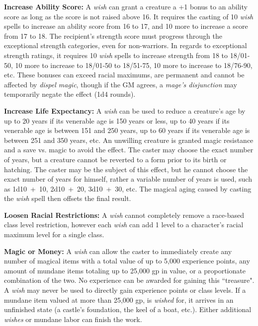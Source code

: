 \begin{multicols}{2}
\textbf{Increase Ability Score:} A \textit{wish} can grant a creature a +1 bonus to an ability score as long as the score is not raised above 16.  It requires the casting of 10 \textit{wish} spells to increase an ability score from 16 to 17, and 10 more to increase a score from 17 to 18.  The recipient's strength score must progress through the exceptional strength categories, even for non-warriors.  In regards to exceptional strength ratings, it requires 10 \textit{wish} spells to increase strength from 18 to 18/01-50, 10 more to increase to 18/01-50 to 18/51-75, 10 more to increase to 18/76-90, etc.  These bonuses can exceed racial maximums, are permanent and cannot be affected by \textit{dispel magic}, though if the GM agrees, a \textit{mage's disjunction} may temporarily negate the effect (1d4 rounds).

\textbf{Increase Life Expectancy:} A \textit{wish} can be used to reduce a creature's age by up to 20 years if its venerable age is 150 years or less, up to 40 years if its venerable age is between 151 and 250 years, up to 60 years if its venerable age is between 251 and 350 years, etc.  An unwilling creature is granted magic resistance and a save vs. magic to avoid the effect.  The caster may choose the exact number of years, but a creature cannot be reverted to a form prior to its birth or hatching.  The caster may be the subject of this effect, but he cannot choose the exact number of years for himself, rather a variable number of years is used, such as 1d10~+~10, 2d10~+~20, 3d10~+~30, etc.  The magical aging caused by casting the \textit{wish} spell then offsets the final result.

\textbf{Loosen Racial Restrictions:} A \textit{wish} cannot completely remove a race-based class level restriction, however each \textit{wish} can add 1 level to a character's racial maximum level for a single class.

\textbf{Magic or Money:} A \textit{wish} can allow the caster to immediately create any number of magical items with a total value of up to 5,000 experience points, any amount of mundane items totaling up to 25,000 gp in value, or a proportionate combination of the two.  No experience can be awarded for gaining this ``treasure".  A \textit{wish} may never be used to directly gain experience points or class levels.  If a mundane item valued at more than 25,000 gp, is \textit{wished} for, it arrives in an unfinished state (a castle's foundation, the keel of a boat, etc.).  Either additional \textit{wishes} or mundane labor can finish the work.


\end{multicols}
